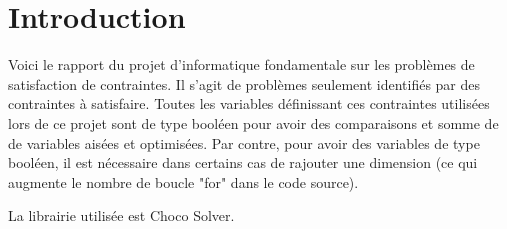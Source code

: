 \section{Introduction}
Voici le rapport du projet d'informatique fondamentale sur les problèmes de satisfaction de contraintes. Il s'agit de problèmes seulement identifiés par des contraintes à satisfaire. Toutes les variables définissant ces contraintes utilisées lors de ce projet sont de type booléen pour avoir des comparaisons et somme de de variables aisées et optimisées. Par contre, pour avoir des variables de type booléen, il est nécessaire dans certains cas de rajouter une dimension (ce qui augmente le nombre de boucle "for" dans le code source).\par 
La librairie utilisée est Choco Solver.
